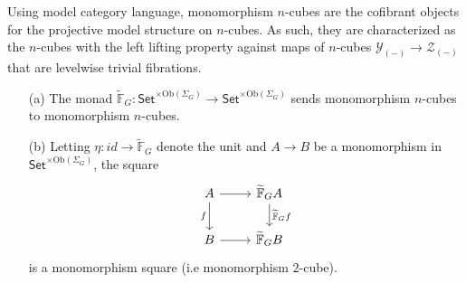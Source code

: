 \documentclass[a4paper,10pt]{article}%
\begin{document}
\begin{remark}\label{MONOCUBE REM}
Using model category language, monomorphism $n$-cubes
are the cofibrant objects for the projective model structure on $n$-cubes. As such, they are characterized as the $n$-cubes with the left lifting property against maps of $n$-cubes $\mathcal{Y}_{(\minus)} \to \mathcal{Z}_{(\minus)}$ that are levelwise trivial fibrations.
\end{remark}

\begin{lemma}\label{MONOCUBE LEM}
\begin{itemize}
\item[(a)]
The monad 
$\widetilde{\mathbb{F}}_G \colon 
\mathsf{Set}^{\times \text{Ob}(\Sigma_G)} 
\to \mathsf{Set}^{\times \text{Ob}(\Sigma_G)}$
sends monomorphism $n$-cubes
to monomorphism $n$-cubes.
\item[(b)]
Letting $\eta \colon id \to \widetilde{\mathbb{F}}_G $ denote the unit and
$A \to B$ be a monomorphism in 
$\mathsf{Set}^{\times \text{Ob}(\Sigma_G)}$, the square
\[
\begin{tikzcd}
	A \ar{r} \ar{d}[swap]{f} &
	\widetilde{\mathbb{F}}_G A 
	\ar{d}{\widetilde{\mathbb{F}}_G f}
\\
	B \ar{r} & \widetilde{\mathbb{F}}_G B 
\end{tikzcd}
\]
is a monomorphism square (i.e monomorphism $2$-cube).
\end{itemize}
\end{lemma}
\end{document}
